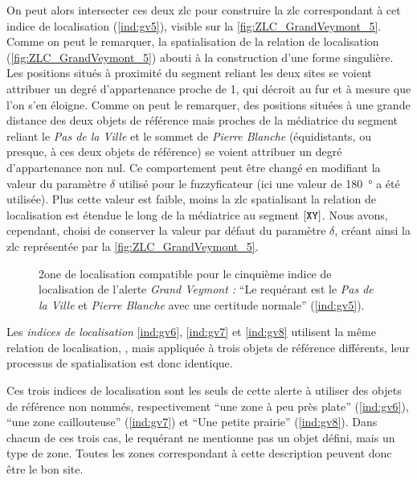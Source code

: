 On peut alors intersecter ces deux \ac{zlc} pour construire la
\ac{zlc} correspondant à cet indice de localisation (\ref{ind:gv5}),
visible sur la \autoref{fig:ZLC_GrandVeymont_5}. Comme on peut le
remarquer, la spatialisation de la relation de localisation
 (\autoref{fig:ZLC_GrandVeymont_5}) abouti
à la construction d'une forme singulière. Les positions situés à
proximité du segment reliant les deux sites se voient attribuer un
degré d'appartenance proche de 1, qui décroit au fur et à mesure que
l'on s'en éloigne. Comme on peut le remarquer, des positions situées à
une grande distance des deux objets de référence mais proches de la
médiatrice du segment reliant le \emph{Pas de la Ville} et le sommet
de \emph{Pierre Blanche} (\ie équidistants, ou presque, à ces deux
objets de référence) se voient attribuer un degré d'appartenance non
nul. Ce comportement peut être changé en modifiant la valeur du
paramètre \(\delta\) utilisé pour le fuzzyficateur
 (ici une valeur de \SI{180}{\degree} a été
utilisée). Plus cette valeur est faible, moins la \ac{zlc}
spatialisant la relation de localisation 
est étendue le long de la médiatrice au segment
$[\text{\texttt{XY}}]$. Nous avons, cependant, choisi de conserver la
valeur par défaut du paramètre \(\delta\), créant ainsi la \ac{zlc}
représentée par la \autoref{fig:ZLC_GrandVeymont_5}.

\begin{figure}
  \centering
  
  \caption{2one de localisation compatible pour le cinquième indice de
    localisation de l'alerte \emph{Grand Veymont :} \enquote{Le
      requérant est \protect{} le \emph{Pas
        de la Ville} et \emph{Pierre Blanche} avec une certitude
      normale} (\ref{ind:gv5}).}
  \label{fig:ZLC_GrandVeymont_5}
\end{figure}


Les \emph{indices de localisation} \ref{ind:gv6}, \ref{ind:gv7} et
\ref{ind:gv8} utilisent la même relation de localisation,
, mais appliquée à trois objets de
référence différents, leur processus de spatialisation est donc
identique.

Ces trois indices de localisation sont les seuls de cette alerte à
utiliser des objets de référence non nommés, respectivement
\enquote{une zone à peu près plate} (\ref{ind:gv6}), \enquote{une zone
  caillouteuse} (\ref{ind:gv7}) et \enquote{Une petite prairie}
(\ref{ind:gv8}). Dans chacun de ces trois cas, le requérant ne
mentionne pas un objet défini, mais un type de zone. Toutes les zones
correspondant à cette description peuvent donc être le bon site.

